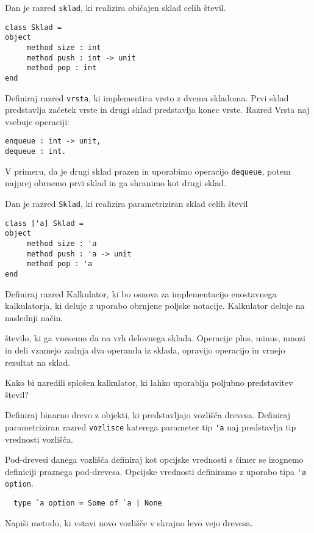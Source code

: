\begin{ex}
Dan je razred \lstinline{sklad}, ki realizira obi\v cajen sklad celih \v stevil.
\begin{lstlisting}
class Sklad =
object 
     method size : int
     method push : int -> unit
     method pop : int
end
\end{lstlisting}

Definiraj razred \lstinline{vrsta}, ki implementira vrsto z dvema skladoma. Prvi sklad predstavlja za\v cetek vrste in drugi sklad predstavlja konec vrste. Razred Vrsta naj vsebuje operaciji: 
\begin{lstlisting}
enqueue : int -> unit, 
dequeue : int. 
\end{lstlisting}
V primeru, da je drugi sklad prazen in uporabimo operacijo \texttt{dequeue}, potem najprej obrnemo prvi sklad in ga shranimo kot drugi sklad.
\end{ex}






\begin{ex}
Dan je razred \texttt{Sklad}, ki realizira parametriziran sklad celih \v stevil
\begin{lstlisting}
class ['a] Sklad =
object 
     method size : 'a
     method push : 'a -> unit
     method pop : 'a
end
\end{lstlisting}
Definiraj razred Kalkulator, ki bo osnova za implementacijo enostavnega kalkulatorja, ki deluje z uporabo obrnjene poljske notacije. Kalkulator deluje na naslednji na\v cin.  

\v stevilo, ki ga vnesemo da na vrh delovnega sklada. Operacije plus, minus, mnozi in deli vzamejo zadnja dva operanda iz sklada, opravijo operacijo in vrnejo rezultat na sklad. 

Kako bi naredili splo\v sen kalkulator, ki lahko uporablja poljubno predstavitev \v stevil?


\end{ex} 



\begin{ex}
  Definiraj binarno drevo z objekti, ki predstavljajo vozli\v s\v
  ca drevesa. Definiraj parametriziran razred \lstinline{vozlisce}
  katerega parameter tip \lstinline{'a} naj predstavlja tip vrednosti
  vozli\v s\v ca.

  Pod-drevesi danega vozli\v s\v ca definiraj kot opcijske vrednosti s
  \v cimer se izognemo definiciji praznega pod-drevesa. Opcijske
  vrednosti definiramo z uporabo tipa \lstinline{'a option}.

\begin{lstlisting}
  type `a option = Some of `a | None
\end{lstlisting}

  Napi\v si metodo, ki vstavi novo vozli\v s\v ce v skrajno levo vejo
  drevesa.
\end{ex} 



